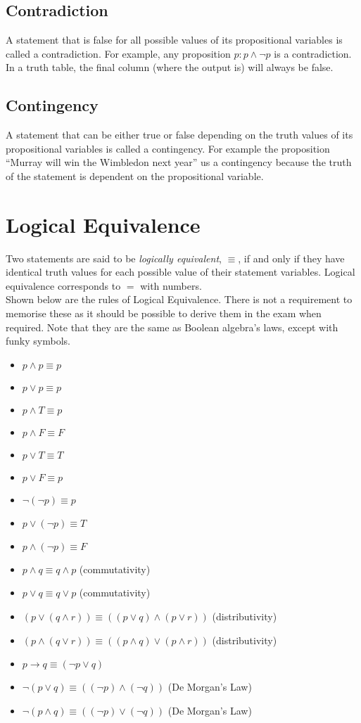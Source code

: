 \subsection{Contradiction}
A statement that is false for all possible values of its propositional variables is called a contradiction. For example, any proposition $p: p \wedge ¬p$ is a contradiction. In a truth table, the final column (where the output is) will always be false. 
\subsection{Contingency}
A statement that can be either true or false depending on the truth values of its propositional variables is called a contingency. For example the proposition ``Murray will win the Wimbledon next year'' us a contingency because the truth of the statement is dependent on the propositional variable. 

\section{Logical Equivalence}
Two statements are said to be \textit{logically equivalent}, $\equiv$, if and only if they have identical truth values for each possible value of their statement variables. Logical equivalence corresponds to $=$ with numbers.\\

Shown below are the rules of Logical Equivalence. There is not a requirement to memorise these as it should be possible to derive them in the exam when required. Note that they are the same as Boolean algebra's laws, except with funky symbols.
\begin{itemize}
    \item $p \wedge p \equiv p$
    \item $p \vee p \equiv p$
    \item $p \wedge T \equiv p$
    \item $p \wedge F \equiv F$
    \item $p \vee T \equiv T$
    \item $p \vee F \equiv p$
    \item $¬(¬p) \equiv p$
    \item $p \vee (¬p) \equiv T$
    \item $p \wedge (¬p) \equiv F$
    \item $p \wedge q \equiv q \wedge p$ (commutativity)
    \item $p \vee q \equiv q \vee p$ (commutativity)
    \item $(p \vee (q \wedge r)) \equiv ((p \vee q) \wedge (p \vee r))$ (distributivity)
    \item $(p \wedge (q \vee r)) \equiv ((p \wedge q) \vee (p \wedge r))$ (distributivity)
    \item $p \rightarrow q \equiv (¬p \vee q)$
    \item $¬(p \vee q) \equiv ((¬p)\wedge(¬q))$ (De Morgan's Law)
    \item $¬(p \wedge q) \equiv ((¬p)\vee(¬q))$ (De Morgan's Law)
\end{itemize}

